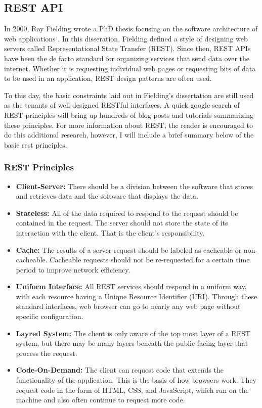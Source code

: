 \subsection{REST API}
In 2000, Roy Fielding wrote a PhD thesis focusing on the software architecture of web applications \cite{fieldingArchitecturalStylesDesign2000}.  In this disseration, Fielding defined a style of designing web servers called Representational State Transfer (REST).  Since then, REST APIs have been the de facto standard for organizing services that send data over the internet.  Whether it is requesting individual web pages or requesting bits of data to be used in an application, REST design patterns are often used. 

To this day, the basic constraints laid out in Fielding's dissertation are still used as the tenants of well designed RESTful interfaces.  A quick google search of REST principles will bring up hundreds of blog posts and tutorials summarizing these principles. For more information about REST, the reader is encouraged to do this additional research, however, I will include a brief summary below of the basic rest principles.

\subsubsection{REST Principles}

\begin{itemize}
    \item \textbf{Client-Server:} There should be a division between the software that stores and retrieves data and the software that displays the data.
    \item \textbf{Stateless:} All of the data required to respond to the request should be contained in the request. The server should not store the state of its interaction with the client. That is the client's responsibility.
    \item \textbf{Cache:} The results of a server request should be labeled as cacheable or non-cacheable.  Cacheable requests should not be re-requested for a certain time period to improve network efficiency.
    \item \textbf{Uniform Interface:} All REST services should respond in a uniform way, with each resource having a Unique Resource Identifier (URI).  Through these standard interfaces, web browser can go to nearly any web page without specific configuration.
    \item \textbf{Layred System:} The client is only aware of the top most layer of a REST system, but there may be many layers beneath the public facing layer that process the request.
    \item \textbf{Code-On-Demand:} The client can request code that extends the functionality of the application.  This is the basis of how browsers work.  They request code in the form of HTML, CSS, and JavaScript, which run on the machine and also often continue to request more code.
\end{itemize}

